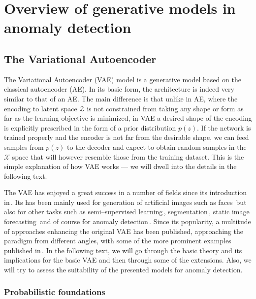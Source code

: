 \chapter{Overview of generative models in anomaly detection} \label{sec:chapter_survey}

\section{The Variational Autoencoder}

The Variational Autoencoder (VAE) model is a generative model based
on the classical autoencoder (AE). In its basic form, the architecture
is indeed very similar to that of an AE. The main difference is that
unlike in AE, where the encoding to latent space $\mathcal{Z}$ is
not constrained from taking any shape or form as far as the learning
objective is minimized, in VAE a desired shape of the encoding is
explicitly prescribed in the form of a prior distribution $p(z)$.
If the network is trained properly and the encoder is not far from
the desirable shape, we can feed samples from $p(z)$ to the decoder
and expect to obtain random samples in the $\mathcal{X}$ space that
will however resemble those from the training dataset. This is the
simple explanation of how VAE works --- we will dwell into the details
in the following text.

The VAE has enjoyed a great success in a number of fields since its
introduction in\,\cite{kingma2013vae}. Its has been mainly used
for generation of artificial images such as faces\,\cite{rezende2014stochastic}
but also for other tasks such as semi--supervised learning\,\cite{kingma2014semi},
segmentation\,\cite{sohn2015learning}, static image forecasting\,\cite{walker2016uncertain}
and of course for anomaly detection\,\cite{an2015variational,xu2018unsupervised,solch2016variational}.
Since its popularity, a multitude of approaches enhancing the original
VAE has been published, approaching the paradigm from different angles,
with some of the more prominent examples published in\,\cite{higgins2017beta,zhao2017infovae,tolstikhin2017wasserstein,makhzani2015adversarial,pu2017adversarial}.
In the following text, we will go through the basic theory and its
implications for the basic VAE and then through some of the extensions.
Also, we will try to assess the suitability of the presented models
for anomaly detection.

\subsection{Probabilistic foundations}


